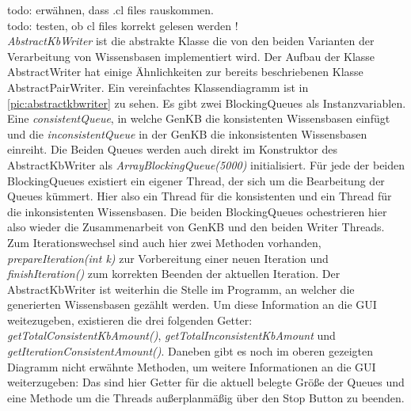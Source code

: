 \documentclass[12pt,a4paper]{article}
\begin{document}
todo: erwähnen, dass .cl files rauskommen. \\
todo: testen, ob cl files korrekt gelesen werden ! \\
\textit{AbstractKbWriter} ist die abstrakte Klasse die von den beiden Varianten der Verarbeitung von Wissensbasen implementiert wird. Der Aufbau der Klasse AbstractWriter hat einige Ähnlichkeiten zur bereits beschriebenen Klasse AbstractPairWriter. Ein vereinfachtes Klassendiagramm ist in \autoref{pic:abstractkbwriter} zu sehen. Es gibt zwei BlockingQueues als Instanzvariablen. Eine \textit{consistentQueue}, in welche GenKB die konsistenten Wissensbasen einfügt und die \textit{inconsistentQueue} in der GenKB die inkonsistenten Wissensbasen einreiht. Die Beiden Queues werden auch direkt im Konstruktor des AbstractKbWriter als \textit{ArrayBlockingQueue(5000)} initialisiert. Für jede der beiden BlockingQueues existiert ein eigener Thread, der sich um die Bearbeitung der Queues kümmert. Hier also ein Thread für die konsistenten und ein Thread für die inkonsistenten Wissensbasen. Die beiden BlockingQueues ochestrieren hier also wieder die Zusammenarbeit von GenKB und den beiden Writer Threads. Zum Iterationswechsel sind auch hier zwei Methoden vorhanden, \textit{prepareIteration(int k)} zur Vorbereitung einer neuen Iteration und \textit{finishIteration()} zum korrekten Beenden der aktuellen Iteration. Der AbstractKbWriter ist weiterhin die Stelle im Programm, an welcher die generierten Wissensbasen gezählt werden. Um diese Information an die GUI weitezugeben, existieren die drei folgenden Getter: \textit{getTotalConsistentKbAmount()}, \textit{getTotalInconsistentKbAmount} und \textit{getIterationConsistentAmount()}.
Daneben gibt es noch im  oberen gezeigten Diagramm nicht erwähnte Methoden, um weitere Informationen an die GUI weiterzugeben: Das sind hier Getter für die aktuell belegte Größe der Queues und eine Methode um die Threads außerplanmäßig über den Stop Button zu beenden.
\end{document}
